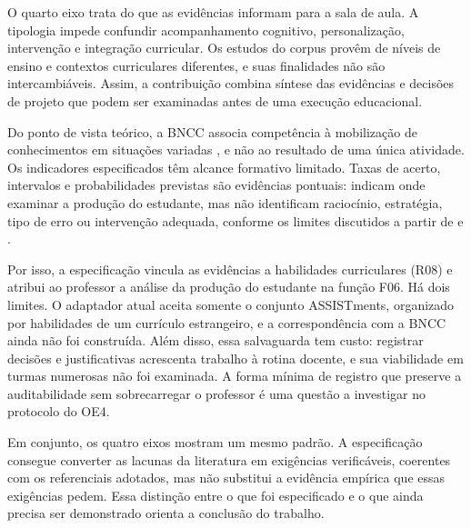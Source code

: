 O quarto eixo trata do que as evidências informam para a sala de aula. A tipologia impede confundir acompanhamento cognitivo, personalização, intervenção e integração curricular. Os estudos do corpus provêm de níveis de ensino e contextos curriculares diferentes, e suas finalidades não são intercambiáveis. Assim, a contribuição combina síntese das evidências e decisões de projeto que podem ser examinadas antes de uma execução educacional.

Do ponto de vista teórico, a BNCC associa competência à mobilização de conhecimentos em situações variadas \cite{BNCC2018}, e não ao resultado de uma única atividade. Os indicadores especificados têm alcance formativo limitado. Taxas de acerto, intervalos e probabilidades previstas são evidências pontuais: indicam onde examinar a produção do estudante, mas não identificam raciocínio, estratégia, tipo de erro ou intervenção adequada, conforme os limites discutidos a partir de  e .

Por isso, a especificação vincula as evidências a habilidades curriculares (R08) e atribui ao professor a análise da produção do estudante na função F06. Há dois limites. O adaptador atual aceita somente o conjunto ASSISTments, organizado por habilidades de um currículo estrangeiro, e a correspondência com a BNCC ainda não foi construída. Além disso, essa salvaguarda tem custo: registrar decisões e justificativas acrescenta trabalho à rotina docente, e sua viabilidade em turmas numerosas não foi examinada. A forma mínima de registro que preserve a auditabilidade sem sobrecarregar o professor é uma questão a investigar no protocolo do OE4.

Em conjunto, os quatro eixos mostram um mesmo padrão. A especificação consegue converter as lacunas da literatura em exigências verificáveis, coerentes com os referenciais adotados, mas não substitui a evidência empírica que essas exigências pedem. Essa distinção entre o que foi especificado e o que ainda precisa ser demonstrado orienta a conclusão do trabalho.

